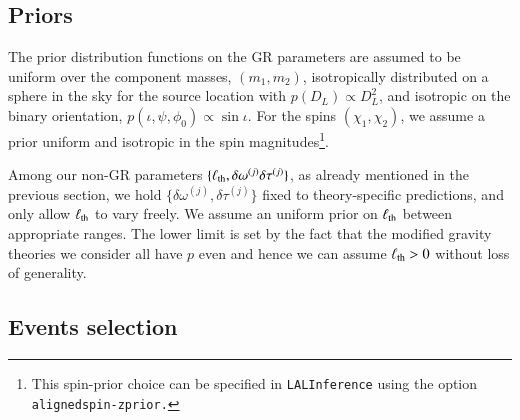\documentclass[twocolumn,
               prd,
               aps,
               superscriptaddress,
               tightenlines,
               nofootinbib,
               eqsecnum,
               amsfonts,
               amsmath,
               longbibliography]{revtex4-1}
\begin{document}
\subsection{Priors}

The prior distribution functions on the GR parameters are assumed to be
uniform over the component masses, $(m_1, m_2)$, isotropically distributed on a
sphere in the sky for the source location with $p(D_L) \propto D_L^2$, and isotropic
on the binary orientation, $p(\iota, \psi, \phi_0) \propto \sin\iota$. For the spins
$(\chi_1, \chi_2)$, we assume a prior uniform and isotropic in the spin magnitudes\footnote{This spin-prior choice can be specified in \texttt{LALInference} using the option \texttt{alignedspin-zprior.}}.
%

Among our non-GR parameters $\{\ell_{\rm th}, \delta \omega^{(j)}\delta \tau^{(j)}\}$,
as already mentioned in the previous section, we hold $\{\delta \omega^{(j)},\delta \tau^{(j)}\}$
fixed to theory-specific predictions, and only allow $\ell_{\rm th}$ to vary freely.
%
We assume an uniform prior on $\ell_{\rm th}$ between appropriate ranges.
%
The lower limit is set by the fact that the modified gravity theories we consider
all have $p$ even and hence we can assume $\ell_{\rm th} > 0$ without loss of
generality.
%


\subsection{Events selection}
\end{document}
